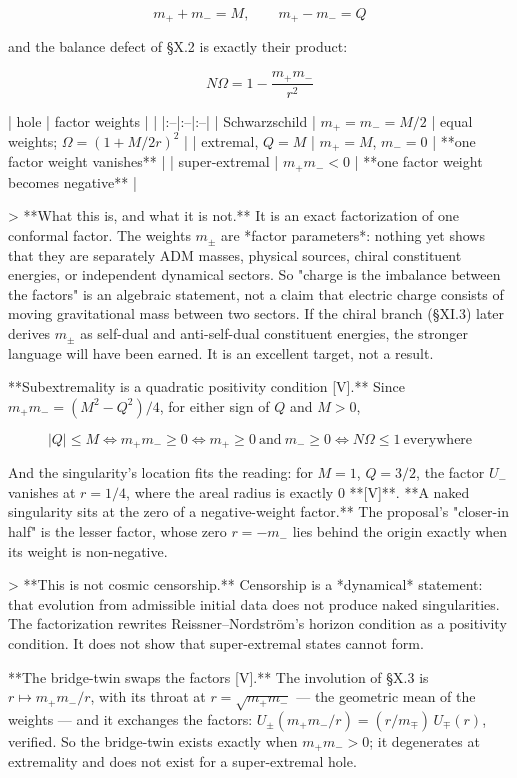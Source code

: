 $$m_++m_- = M,\qquad m_+-m_- = Q$$

and the balance defect of §X.2 is exactly their product:

$$\boxed{\ N\Omega = 1-\frac{m_+m_-}{r^2}\ }$$

| hole | factor weights | |
|:--|:--|:--|
| Schwarzschild | $m_+ = m_- = M/2$ | equal weights; $\Omega = (1+M/2r)^2$ |
| extremal, $Q = M$ | $m_+ = M$, $m_- = 0$ | **one factor weight vanishes** |
| super-extremal | $m_+m_-<0$ | **one factor weight becomes negative** |

> **What this is, and what it is not.** It is an exact factorization of one conformal factor. The weights $m_\pm$ are *factor parameters*: nothing yet shows that they are separately ADM masses, physical sources, chiral constituent energies, or independent dynamical sectors. So "charge is the imbalance between the factors" is an algebraic statement, not a claim that electric charge consists of moving gravitational mass between two sectors. If the chiral branch (§XI.3) later derives $m_\pm$ as self-dual and anti-self-dual constituent energies, the stronger language will have been earned. It is an excellent target, not a result.

**Subextremality is a quadratic positivity condition [V].** Since $m_+m_- = (M^2-Q^2)/4$, for either sign of $Q$ and $M>0$,

$$|Q|\leq M\iff m_+m_-\geq0\iff m_+\geq0\ \text{and}\ m_-\geq0\iff N\Omega\leq1\ \text{everywhere}$$

And the singularity's location fits the reading: for $M = 1$, $Q = 3/2$, the factor $U_-$ vanishes at $r = 1/4$, where the areal radius is exactly $0$ **[V]**. **A naked singularity sits at the zero of a negative-weight factor.** The proposal's "closer-in half" is the lesser factor, whose zero $r = -m_-$ lies behind the origin exactly when its weight is non-negative.

> **This is not cosmic censorship.** Censorship is a *dynamical* statement: that evolution from admissible initial data does not produce naked singularities. The factorization rewrites Reissner–Nordström's horizon condition as a positivity condition. It does not show that super-extremal states cannot form.

**The bridge-twin swaps the factors [V].** The involution of §X.3 is $r\mapsto m_+m_-/r$, with its throat at $r = \sqrt{m_+m_-}$ — the geometric mean of the weights — and it exchanges the factors: $U_\pm(m_+m_-/r) = (r/m_\mp)\,U_\mp(r)$, verified. So the bridge-twin exists exactly when $m_+m_->0$; it degenerates at extremality and does not exist for a super-extremal hole.

